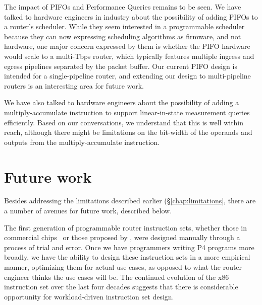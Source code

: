 The impact of PIFOs and Performance Queries remains to be seen. We have talked
to hardware engineers in industry about the possibility of adding PIFOs to a
router's scheduler. While they seem interested in a programmable scheduler
because they can now expressing scheduling algorithms as firmware, and not
hardware, one major concern expressed by them is whether the PIFO hardware
would scale to a multi-Tbps router, which typically features multiple ingress
and egress pipelines separated by the packet buffer. Our current PIFO design is
intended for a single-pipeline router, and extending our design to
multi-pipeline routers is an interesting area for future work.

We have also talked to hardware engineers about the possibility of adding a
multiply-accumulate instruction to support linear-in-state measurement queries
efficiently. Based on our conversations, we understand that this is well within
reach, although there might be limitations on the bit-width of the operands and
outputs from the multiply-accumulate instruction.

\section{Future work}
\label{s:future}

Besides addressing the limitations described earlier (\S\ref{chap:limitations},
there are a number of avenues for future work, described below.

 The first generation of programmable
router instruction sets, whether those in commercial chips~\cite{xpliant,
flexpipe, tofino, rmt} or those proposed by \pktlanguage, were designed
manually through a process of trial and error. Once we have programmers writing
P4 programs more broadly, we have the ability to design these instruction sets
in a more empirical manner, optimizing them for actual use cases, as opposed to
what the router engineer thinks the use cases will be. The continued evolution
of the x86 instruction set over the last four decades suggests that there is
considerable opportunity for workload-driven instruction set design.

